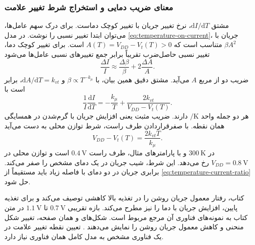 \subsubsection*{معنای ضریب دمایی و استخراج شرط تغییر علامت}
مشتق \(\mathrm{d}I/\mathrm{d}T\)، نرخ تغییر جریان با تغییر کوچک
دماست. برای درک سهم عامل‌ها، می‌توان ابتدا تغییر نسبی را نوشت.
در مدل \eqref{eq:temperature-on-current}، جریان با \(\beta A^2\)
متناسب است که \(A(T)=V_{DD}-V_t(T)>0\) است. برای تغییر کوچک دما،
تغییر نسبی حاصل‌ضرب تقریباً برابر جمع تغییرهای نسبی عامل‌ها می‌شود
\begin{equation}
 \frac{\Delta I}{I}\approx
 \frac{\Delta\beta}{\beta}+2\frac{\Delta A}{A}.
 \label{eq:temperature-fractional-change}
\end{equation}
ضریب دو از مربع \(A\) می‌آید. مشتق دقیق همین بیان، با
\(\beta\propto T^{-k_\mu}\) و
\(\mathrm{d}A/\mathrm{d}T=k_{vt}\)، برابر است با
\begin{equation}
 \frac{1}{I}\frac{\mathrm{d}I}{\mathrm{d}T}
 =-\frac{k_\mu}{T}+\frac{2k_{vt}}{V_{DD}-V_t(T)}.
 \label{eq:temperature-coefficient}
\end{equation}
هر دو جمله واحد \(\unit{\per\kelvin}\) دارند. ضریب مثبت یعنی افزایش
جریان با گرم‌شدن در همسایگی همان نقطه. با صفرقراردادن طرف راست،
شرط توازن محلی به دست می‌آید
\begin{equation}
 V_{DD}-V_t(T)=\frac{2k_{vt}T}{k_\mu}.
 \label{eq:temperature-crossover}
\end{equation}
در \(\qty{300}{\kelvin}\) و با پارامترهای مثال، طرف راست
\(\qty{0.4}{\volt}\) است و توازن محلی در
\(V_{DD}=\qty{0.8}{\volt}\) رخ می‌دهد. این شرط، شیب جریان در یک
دمای مشخص را صفر می‌کند. برابری جریان در دو دمای با فاصله زیاد
باید مستقیماً از \eqref{eq:temperature-current-ratio} حل شود.

کتاب، رفتار معمول جریان روشن را در تغذیه بالا کاهشی توصیف می‌کند و
برای تغذیه پایین، افزایش جریان با دما را نیز مطرح می‌کند. بازه
تقریبی \(\qty{0.7}{\volt}\) تا \(\qty{1.1}{\volt}\) در متن کتاب به
نمونه‌های فناوری آن مرجع مربوط است. شکل‌های  و
 همان صفحه، تغییر شکل منحنی و کاهش معمول جریان روشن
را نمایش می‌دهند \cite[صفحه ۸۵]{weste}. تعیین نقطه تغییر علامت در
یک فناوری مشخص به مدل کامل همان فناوری نیاز دارد.

